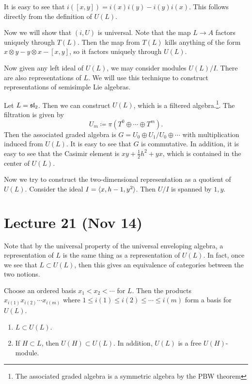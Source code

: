 \documentclass[twoside, 10pt]{article}
\begin{document}
    It is easy to see that $i([x,y]) = i(x)i(y) - i(y)i(x)$. This follows directly from the definition of $U(L)$.

    Now we will show that $(i,U)$ is universal. Note that the map $L \to A$ factors uniquely through $T(L)$. Then the map from $T(L)$ kills anything of the form $x \otimes y - y \otimes x - [x,y]$, so it factors uniquely through $U(L)$.

    Now given any left ideal of $U(L)$, we may consider modules $U(L)/I$. There are also representations of $L$. We will use this technique to construct representations of semisimple Lie algebras.

    \begin{exm}
        Let $L = \mathfrak{sl}_2$. Then we can construct $U(L)$, which is a filtered algebra.\footnote{The associated graded algebra is a symmetric algebra by the PBW theorem}. The filtration is given by
        \[ U_m \coloneqq \pi(T^0 \oplus \cdots \oplus T^m).\]
        Then the associated graded algebra is $G = U_0 \oplus U_1/U_0 \oplus \cdots$ with multiplication induced from $U(L)$. It is easy to see that $G$ is commutative. In addition, it is easy to see that the Casimir element is $xy+\frac{1}{2}h^2 + yx$, which is contained in the center of $U(L)$.

        Now we try to construct the two-dimensional representation as a quotient of $U(L)$. Consider the ideal $I = \langle x,h-1, y^2\rangle$. Then $U/I$ is spanned by $1,y$.
    \end{exm}

    \section{Lecture 21 (Nov 14)}%
    \label{sec:lecture_21_nov_14_}
    
    Note that by the universal property of the universal enveloping algebra, a representation of $L$ is the same thing as a representation of $U(L)$. In fact, once we see that $L \subset U(L)$, then this gives an equivalence of categories between the two notions.

    \begin{thm}
        Choose an ordered basis $x_1 < x_2 < \cdots$ for $L$. Then the products $x_{i(1)}x_{i(2)}\cdots x_{i(m)}$ where $1 \leq i(1) \leq i(2) \leq \cdots \leq i(m)$ form a basis for $U(L)$.
    \end{thm}

    \begin{cor}
        \begin{enumerate}
            \item $L \subset U(L)$.
            \item If $H \subset L$, then $U(H) \subset U(L)$. In addition, $U(L)$ is a free $U(H)$-module.
        \end{enumerate}
    \end{cor}
\end{document}
